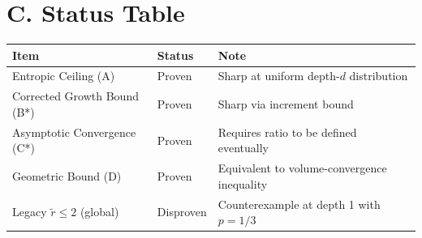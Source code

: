 \documentclass[11pt]{article}
\theoremstyle{remark}
\begin{document}
\section*{C. Status Table}
\begin{center}
\begin{tabular}{@{}lll@{}}
\toprule
Item & Status & Note \\
\midrule
Entropic Ceiling (A) & Proven & Sharp at uniform depth-$d$ distribution \\
Corrected Growth Bound (B*) & Proven & Sharp via increment bound \\
Asymptotic Convergence (C*) & Proven & Requires ratio to be defined eventually \\
Geometric Bound (D) & Proven & Equivalent to volume-convergence inequality \\
Legacy $\tilde r\le2$ (global) & Disproven & Counterexample at depth 1 with $p=1/3$ \\
\bottomrule
\end{tabular}
\end{center}
\end{document}
